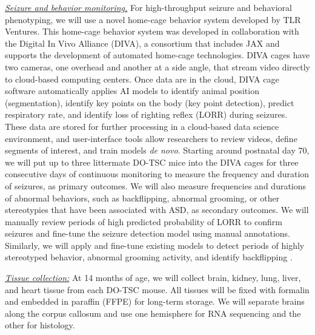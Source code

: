 \documentclass[
  12pt,
]{article}
\begin{document}
\textit{\underline{Seizure and behavior monitoring.}} For
high-throughput seizure and behavioral phenotyping, we will use a novel
home-cage behavior system developed by TLR Ventures. This home-cage
behavior system was developed in collaboration with the Digital In Vivo
Alliance (DIVA), a consortium that includes JAX and supports the
development of automated home-cage technologies. DIVA cages have two
cameras, one overhead and another at a side angle, that stream video
directly to cloud-based computing centers. Once data are in the cloud,
DIVA cage software automatically applies AI models to identify animal
position (segmentation), identify key points on the body (key point
detection), predict respiratory rate, and identify loss of righting
reflex (LORR) during seizures. These data are stored for further
processing in a cloud-based data science environment, and user-interface
tools allow researchers to review videos, define segments of interest,
and train models \textit{de novo}. Starting around postnatal day 70, we
will put up to three littermate DO-TSC mice into the DIVA cages for
three consecutive days of continuous monitoring to measure the frequency
and duration of seizures, as primary outcomes. We will also measure
frequencies and durations of abnormal behaviors, such as backflipping,
abnormal grooming, or other stereotypies that have been associated with
ASD, as secondary outcomes. We will manually review periods of high
predicted probability of LORR to confirm seizures and fine-tune the
seizure detection model using manual annotations. Similarly, we will
apply and fine-tune existing models to detect periods of highly
stereotyped behavior, abnormal grooming activity, and identify
backflipping
\cite{30127430, 26687221, 30573820, 31570119, 29779950, 37091193, 34718812, 35021077, 33729153}.

\textit{\underline{Tissue collection:}} At 14 months of age, we will
collect brain, kidney, lung, liver, and heart tissue from each DO-TSC
mouse. All tissues will be fixed with formalin and embedded in paraffin
(FFPE) for long-term storage. We will separate brains along the corpus
callosum and use one hemisphere for RNA sequencing and the other for
histology.
\end{document}
